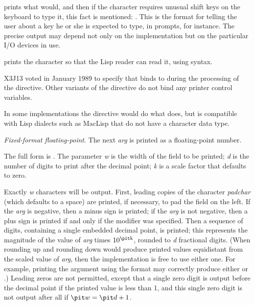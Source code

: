 \begin{flushdesc}
 prints what  would, and then
if the character requires unusual shift keys on the keyboard to type it,
this fact is mentioned: .  This is the
format for telling the user about a key he or she is expected to type,
in prompts, for instance.  The precise output may depend not only
on the implementation but on the particular I/O devices in use.

 prints the character so that the Lisp reader can read it,
using \cd{\#{\Xbackslash}} syntax.

\begin{new}
X3J13 voted in January 1989
to specify that  binds  to 
during the processing of the  directive.
Other variants of the  directive do not bind any printer control variables.
\end{new}

\beforenoterule
\begin{rationale}
In some implementations the  directive would
do what  does,
but  is compatible
with Lisp dialects such as MacLisp that do not have a character data type.
\end{rationale}
\afternoterule

\item[\cd{{\Xtilde}F}]
{\it Fixed-format floating-point}.
The next {\it arg} is printed as a floating-point
number.

The full form is .
The parameter {\it w}
is the width of the field to be printed; {\it d} is the number
of digits to print after the decimal point; {\it k} is a scale factor
that defaults to zero.

Exactly {\it w} characters will
be output.  First, leading copies of the character {\it padchar}
(which defaults to a space) are printed, if necessary, to pad the
field on the left.
If the {\it arg} is negative, then a minus sign is printed;
if the {\it arg} is not negative, then a plus sign is printed
if and only if the \cd{{\Xatsign}} modifier was specified.  Then a sequence
of digits, containing a single embedded decimal point, is printed;
this represents the magnitude of the value of {\it arg} times $10^{\hbox{\scriptsize\it k}}$,
rounded to {\it d} fractional digits.
(When rounding up and rounding down would produce printed values
equidistant from the scaled value of {\it arg}, then the implementation
is free to use either one.  For example, printing the argument
 using the format  may correctly produce
either  or .)
Leading zeros are not permitted, except that a single
zero digit is output before the decimal point if the printed value
is less than 1, and this single zero digit is not output
after all if ${\it w}={\it d}+1$.


\end{flushdesc}
